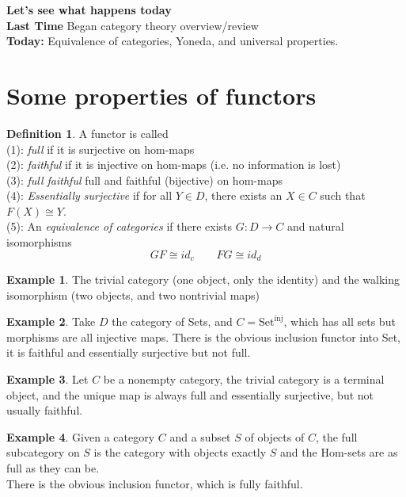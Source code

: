 \documentclass{article}
\theoremstyle{definition}
\newtheorem{example}{Example}[section]
\theoremstyle{definition}
\newtheorem{definition}{Definition}[section]
\theoremstyle{remark}
\begin{document}
\textbf{Let's see what happens today}\\

\textbf{Last Time} Began category theory overview/review\\

\textbf{Today:} Equivalence of categories, Yoneda, and universal properties.\\

\section*{Some properties of functors}

\begin{definition}
	A functor is called \\
	(1): \textit{full} if it is surjective on hom-maps\\
	(2): \textit{faithful} if it is injective on hom-maps (i.e. no information is lost)\\
	(3): \textit{full faithful} full and faithful (bijective) on hom-maps \\
	(4): \textit{Essentially surjective} if for all $Y \in D$, there exists an $X \in C$ such that $F(X) \cong Y$.\\
(5): An \textit{equivalence of categories} if there exists $G: D \to C$ and natural isomorphisms 
\[GF \cong id_c \quad \quad FG \cong id_d\]
\end{definition}

\begin{example}
	The trivial category (one object, only the identity) and the walking isomorphism (two objects, and two nontrivial maps)
\end{example}

\begin{example}
	Take $D$ the category of Sets, and $C = \text{Set}^{\text{inj}}$, which has all sets but morphisms are all injective maps.
	There is the obvious inclusion functor into Set, it is faithful and essentially surjective but not full.
\end{example}

\begin{example}
	Let $C$ be a nonempty category, the trivial category is a terminal object, and the unique map is always full and essentially surjective, but not usually faithful.
\end{example}

\begin{example}
	Given a category $C$ and a subset $S$ of objects of $C$, the full subcategory on $S$ is the category with objects exactly $S$ and the Hom-sets are as full as they can be.\\
There is the obvious inclusion functor, which is fully faithful.
\end{example}
\end{document}
